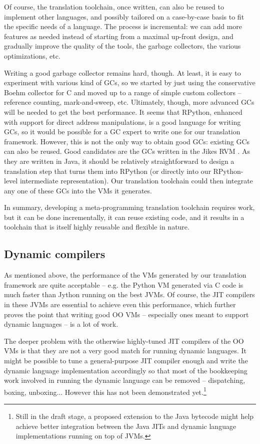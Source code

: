 \documentclass{llncs}
\begin{document}
Of course, the translation toolchain, once written, can also be reused
to implement other languages, and possibly tailored on a case-by-case
basis to fit the specific needs of a language.  The process is
incremental: we can add more features as needed instead of starting from
a maximal up-front design, and gradually improve the quality of the
tools, the garbage collectors, the various optimizations, etc.

Writing a good garbage collector remains hard, though.  At least, it is
easy to experiment with various kind of GCs, so we started by just using
the conservative Boehm \cite{Boehm} collector for C and moved up to a
range of simple custom collectors -- reference counting, mark-and-sweep,
etc.  Ultimately, though, more advanced GCs will be needed to get the
best performance.  It seems that RPython, enhanced with support for
direct address manipulations, is a good language for writing GCs, so it
would be possible for a GC expert to write one for our translation
framework.  However, this is not the only way to obtain good GCs:
existing GCs can also be reused.  Good candidates are the GCs written in
the Jikes RVM \cite{JikesGC}.  As they are written in Java, it should be
relatively straightforward to design a translation step that turns them
into RPython (or directly into our RPython-level intermediate
representation).  Our translation toolchain could then integrate any one
of these GCs into the VMs it generates.

In summary, developing a meta-programming translation toolchain requires
work, but it can be done incrementally, it can reuse existing code, and
it results in a toolchain that is itself highly reusable and flexible in
nature.

\subsection{Dynamic compilers}
\label{subsect:dynamic_compilers}

As mentioned above, the performance of the VMs generated by our
translation framework are quite acceptable -- e.g. the Python VM
generated via C code is much faster than Jython running on the best
JVMs.  Of course, the JIT compilers in these JVMs are essential to
achieve even this performance, which further proves the point that
writing good OO VMs -- especially ones meant to support dynamic
languages -- is a lot of work.

The deeper problem with the otherwise highly-tuned JIT compilers of the
OO VMs is that they are not a very good match for running dynamic
languages.  It might be possible to tune a general-purpose JIT compiler
enough and write the dynamic language implementation accordingly so
that most of the bookkeeping work involved in running the dynamic
language can be removed -- dispatching, boxing, unboxing...  However
this has not been demonstrated yet.\footnote
{Still in the draft stage, a proposed
extension to the Java bytecode \cite{invokedynamic} might help achieve
better integration between the Java JITs and dynamic language
implementations running on top of JVMs.}
\end{document}
